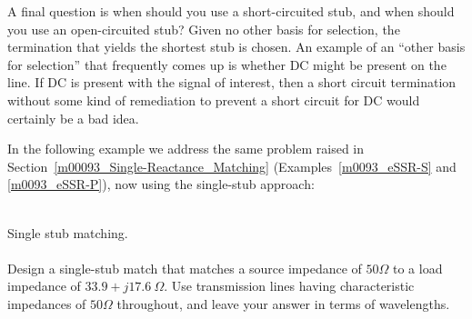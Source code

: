A final question is when should you use a short-circuited stub, and when should you use an open-circuited stub?
Given no other basis for selection, the termination that yields the shortest stub is chosen.
An example of an ``other basis for selection'' that frequently comes up is whether DC might be present on the line. If DC is present with the signal of interest, then a short circuit termination without some kind of remediation to prevent a short circuit for DC would certainly be a bad idea.

In the following example we address the same problem raised in Section~\ref{m00093_Single-Reactance_Matching} (Examples~\ref{m0093_eSSR-S} and \ref{m0093_eSSR-P}), now using the single-stub approach:
~\\
%
~\\ \begin{example} 
\begin{mdframed}[backgroundcolor=brown!20,linecolor=brown!20]\raggedright
Single stub matching.
\\~\\
Design a single-stub match that matches a source impedance of $50\Omega$ to a load impedance of $33.9 + j17.6~\Omega$. %
Use transmission lines having characteristic impedances of $50\Omega$ throughout, and leave your answer in terms of wavelengths.


\end{mdframed}
\end{example}
